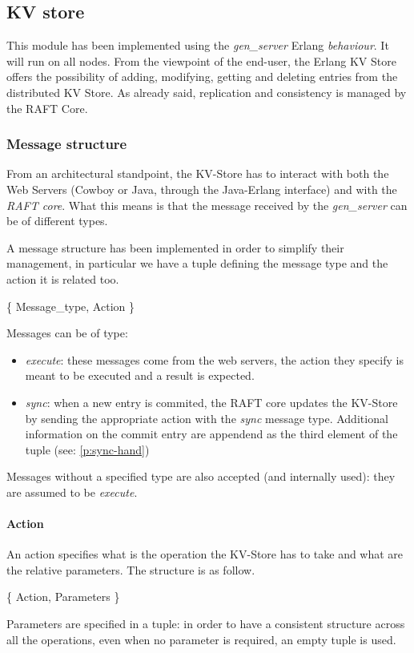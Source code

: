 \documentclass[a4paper]{article}
\begin{document}
\subsection{KV store}

This module has been implemented using the \emph{gen\_server} Erlang 
\emph{behaviour}. It will run on all nodes.
From the viewpoint of the end-user, the Erlang KV Store offers the 
possibility of adding, modifying, getting and deleting entries from
the distributed KV Store. As already said, replication and consistency 
is managed by the RAFT Core.

\subsubsection{Message structure}
From an architectural standpoint, the KV-Store has to interact with both the
Web Servers (Cowboy or Java, through the Java-Erlang interface) and with the 
\emph{RAFT core}.
What this means is that the message received by the \emph{gen\_server} can be of 
different types.

A message structure has been implemented in order to simplify their management,
in particular we have a tuple defining the message type and the action it is 
related too.

\begin{center}
\{ Message\_type, Action \}
\end{center}

Messages can be of type:
\begin{itemize}
  \item{\emph{execute}}: these messages come from the web servers, the action they specify is meant to be executed and a result is expected.
  \item{\emph{sync}}: when a new entry is commited, the RAFT core updates the KV-Store by sending the appropriate action with the \emph{sync} message type. Additional information on the commit entry are appendend as the third element of the tuple (see: \ref{p:sync-hand})
\end{itemize}

Messages without a specified type are also accepted (and internally used): they are assumed to be \emph{execute}.

\paragraph{Action}
An action specifies what is the operation the KV-Store has to take and what are the relative parameters. The structure is as follow.
\begin{center}
  \{ Action, Parameters \}
\end{center}
Parameters are specified in a tuple: in order to have a consistent structure across all the operations, even when no parameter is required, an empty tuple is used.
\end{document}
